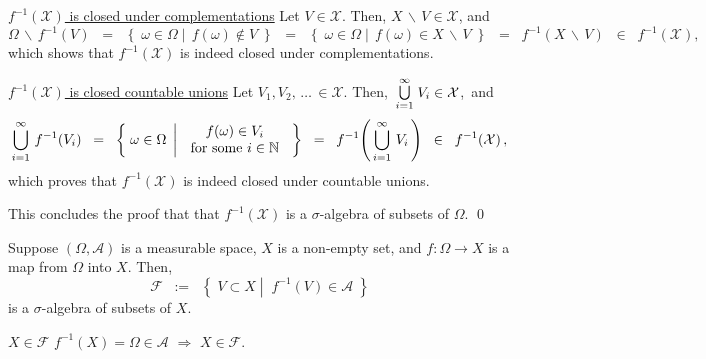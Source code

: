 \vskip 0.5cm
\noindent
\underline{$f^{-1}\!\left(\mathcal{X}\right)$ is closed under complementations}\quad
Let $V \in \mathcal{X}$. Then, $X\,\backslash\,V \in \mathcal{X}$, and
\begin{equation*}
\Omega\,\backslash\,f^{-1}(V)
\;\; = \;\;
\left\{\;
\omega \in \Omega
\;\left\vert\;\,
f(\omega) \notin V
\right.
\;\right\}
\;\; = \;\;
\left\{\;
\omega \in \Omega
\;\left\vert\;\,
f(\omega) \in X\,\backslash\,V
\right.
\;\right\}
\;\; = \;\;
f^{-1}\!\left(X\,\backslash\,V\right)
\;\; \in \;\; f^{-1}\!\left(\mathcal{X}\right),
\end{equation*}
which shows that $f^{-1}\!\left(\mathcal{X}\right)$ is indeed closed under complementations.

\vskip 0.5cm
\noindent
\underline{$f^{-1}\!\left(\mathcal{X}\right)$ is closed countable unions}\quad
Let $V_{1}, V_{2}, \,\ldots\, \in \mathcal{X}$. Then,
\,$\overset{\infty}{\underset{i=1}{\textnormal{\large$\bigcup$}}}\;V_{i} \in \mathcal{X}$,\, and
\begin{equation*}
\bigcup_{i=1}^{\infty}\,f^{-1}\!\left(V_{i}\right)
\;\; = \;\;
\left\{\;
\omega \in \Omega
\;\left\vert\;\,
\begin{array}{c}
	f(\omega) \in V_{i} \\
	\textnormal{for some $i \in \mathbb{N}$}
\end{array}
\right.
\;\right\}
\;\; = \;\;
f^{-1}\!\left(\,\bigcup_{i=1}^{\infty}\,V_{i}\,\right)
\;\; \in \;\; f^{-1}\!\left(\mathcal{X}\right),
\end{equation*}
which proves that $f^{-1}\!\left(\mathcal{X}\right)$ is indeed closed under countable unions.

\vskip 0.3cm
\noindent
This concludes the proof that that $f^{-1}\!\left(\mathcal{X}\right)$ is a $\sigma$-algebra of
subsets of $\Omega$.
\qed

\begin{lemma}\label{PushforwardsPreserveSigmaAlgebras}
\mbox{}\vskip 0.1cm
\noindent
Suppose $\left(\Omega,\mathcal{A}\right)$ is a measurable space,
$X$ is a non-empty set, and $f : \Omega \longrightarrow X$
is a map from $\Omega$ into $X$. Then,
\begin{equation*}
\mathcal{F}
\;\; := \;\;
\left\{\;
V \subset X
\;\left\vert\;\;
f^{-1}\left(V\right) \in \mathcal{A}
\right.
\;\right\}
\end{equation*}
is a $\sigma$-algebra of subsets of $X$.
\end{lemma}
\proof
\vskip 0.1cm
\noindent
\underline{$X \in \mathcal{F}$}\quad
$f^{-1}(X) = \Omega \in \mathcal{A}$ \;$\Longrightarrow$\; $X \in \mathcal{F}$.

